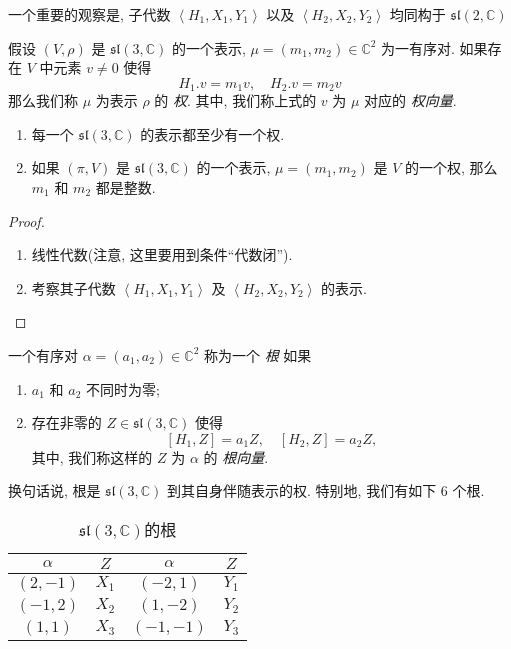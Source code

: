 一个重要的观察是, 子代数 \( \left\langle H_1, X_1, Y_1 \right\rangle \) 以及 \(
\left\langle H_2, X_2, Y_2 \right\rangle \) 均同构于 \( \mathfrak{sl}(2,
\mathbb{C}) \)

假设 \( (V, \rho) \) 是 \( \mathfrak{sl}(3, \mathbb{C}) \) 的一个表示, \(
\mu = (m_1, m_2) \in \mathbb{C}^2 \) 为一有序对.
如果存在 \( V \) 中元素 \( v \neq 0 \) 使得
\[
  H_1.v = m_1 v,\quad H_2.v = m_2 v
\]
那么我们称 \( \mu \) 为表示 \( \rho \) 的 \emph{权}. 其中, 我们称上式的 \( v \)
为 \( \mu \) 对应的 \emph{权向量}.

\begin{lemma}
  \begin{enumerate}
    \item 每一个 \( \mathfrak{sl}(3, \mathbb{C}) \) 的表示都至少有一个权.
    \item 如果 \( (\pi, V) \) 是 \( \mathfrak{sl}(3, \mathbb{C}) \) 的一个表示,
      \( \mu = (m_1, m_2) \) 是 \( V \) 的一个权, 那么 \( m_1 \) 和 \( m_2 \)
      都是整数.
  \end{enumerate}
\end{lemma}
\begin{proof}
  \begin{enumerate}
    \item 线性代数(注意, 这里要用到条件``代数闭'').
    \item 考察其子代数 \( \left\langle H_1, X_1, Y_1 \right\rangle \) 及 \( \left\langle
  H_2, X_2, Y_2 \right\rangle \) 的表示.
  \end{enumerate}
\end{proof}

一个有序对 \( \alpha = (a_1, a_2) \in \mathbb{C}^2 \) 称为一个 \emph{根} 如果
\begin{enumerate}
  \item \( a_1 \) 和 \( a_2 \) 不同时为零;
  \item 存在非零的 \( Z \in \mathfrak{sl}(3, \mathbb{C}) \) 使得
    \[
      [H_1, Z] = a_1 Z,\quad [H_2, Z] = a_2 Z,
    \]
    其中, 我们称这样的 \( Z \) 为 \( \alpha \) 的 \emph{根向量}.
\end{enumerate}
换句话说, 根是 \( \mathfrak{sl}(3, \mathbb{C}) \) 到其自身伴随表示的权. 特别地, 我们有如下 \( 6 \) 个根.

\begin{table}[H]
  \centering
  \begin{tabular}{cccc}
    \( \alpha \) & \( Z \) & \( \alpha \) & \( Z \)\\
    \hline
    \( (2, -1) \) &\( X_1 \) &\( (-2, 1) \) &\( Y_1 \)\\
    \( (-1, 2) \) &\( X_2 \) &\( (1, -2) \) &\( Y_2 \)\\
    \( (1, 1) \) &\( X_3 \) &\( (-1, -1) \) &\( Y_3 \)
  \end{tabular}
  \caption{\( \mathfrak{sl}(3, \mathbb{C}) \)的根}
  \label{table-sl3C-basis}
\end{table}

